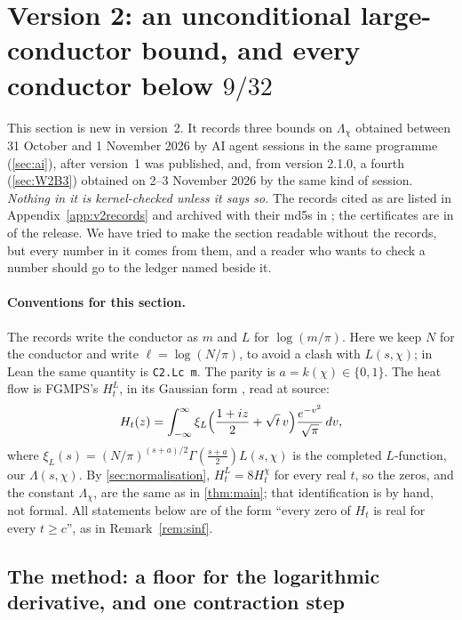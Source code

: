 \documentclass[11pt]{article}
\theoremstyle{definition}
\newcommand{\lean}[1]{\texttt{#1}}
\newcommand{\Lc}{\Lambda}
\begin{document}
\section{Version 2: an unconditional large-conductor bound, and every conductor below $9/32$}\label{sec:v2}

This section is new in version~2. It records three bounds on $\Lc_\chi$ obtained between 31 October and 1 November 2026 by AI agent sessions in the same programme (\cref{sec:ai}), after version~1 was published, and, from version 2.1.0, a fourth (\cref{sec:W2B3}) obtained on 2--3 November 2026 by the same kind of session. \emph{Nothing in it is kernel-checked unless it says so.} The records cited as \cite{dq1records} are listed in Appendix~\ref{app:v2records} and archived with their md5s in ; the certificates are in  of the release. We have tried to make the section readable without the records, but every number in it comes from them, and a reader who wants to check a number should go to the ledger named beside it.

\paragraph{Conventions for this section.} The records write the conductor as $m$ and $L$ for $\log(m/\pi)$. Here we keep $N$ for the conductor and write $\ell = \log(N/\pi)$, to avoid a clash with $L(s,\chi)$; in Lean the same quantity is \lean{C2.Lc m}. The parity is $a = k(\chi) \in \{0,1\}$. The heat flow is FGMPS's $H^L_t$, in its Gaussian form \cite[(4.1)]{FGMPS2026}, read at source:
\begin{equation}\label{eq:gaussform}
H_t(z) = \int_{-\infty}^{\infty} \xi_L\Bigl(\frac{1+iz}{2} + \sqrt t\,v\Bigr)\frac{e^{-v^2}}{\sqrt\pi}\,dv ,
\end{equation}
where $\xi_L(s) = (N/\pi)^{(s+a)/2}\Gamma(\tfrac{s+a}{2})L(s,\chi)$ is the completed $L$-function, our $\Lc(s,\chi)$. By \cref{sec:normalisation}, $H^L_t = 8H^\chi_t$ for every real $t$, so the zeros, and the constant $\Lc_\chi$, are the same as in \cref{thm:main}; that identification is by hand, not formal. All statements below are of the form ``every zero of $H_t$ is real for every $t \ge c$'', as in Remark~\ref{rem:sinf}.

\subsection{The method: a floor for the logarithmic derivative, and one contraction step}\label{sec:v2method}
\end{document}
